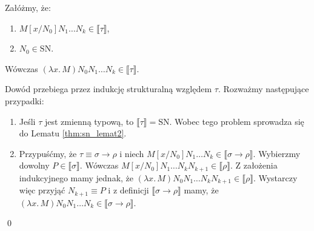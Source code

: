 \begin{lemat}\label{thm:sn_lemat3}
  Załóżmy, że:
  \begin{enumerate}[label=(\alph*)]
    \setlength\itemsep{0em}
    \item  \(M[x/N_0]N_1\dots N_k\in \llbracket \tau \rrbracket\),\label{def:l3_a}
    \item  \(N_0\in \mathrm{SN}\).\label{def:l3_b}
  \end{enumerate}
  Wówczas \((\lambda x.\,M)N_0 N_1 \dots N_k \in \llbracket \tau \rrbracket \).
\end{lemat}
\begin{dowod}
  Dowód przebiega przez indukcję strukturalną względem \(\tau\). Rozważmy następujące przypadki:
  \begin{enumerate}[label=(\alph*)]
    \setlength\itemsep{0em}
    \item Jeśli \(\tau\) jest zmienną typową, to \(\llbracket \tau \rrbracket=\mathrm{SN}\). Wobec tego problem sprowadza się do Lematu \ref{thm:sn_lemat2}.  
    \item Przypuśćmy, że \(\tau\equiv \sigma\to\rho\) i niech \(M[x/N_0]N_1\dots N_k \in \llbracket \sigma\to \rho \rrbracket\). Wybierzmy dowolny \(P\in\llbracket\sigma\rrbracket\). Wówczas \(M[x/N_0] N_1 \dots N_k N_{k+1}\in\llbracket \rho\rrbracket\). Z założenia indukcyjnego mamy jednak, że 
      \(
        (\lambda x.\,M)N_0 N_1\dots N_k N_{k+1}\in\llbracket \rho \rrbracket.
      \)
      Wystarczy więc przyjąć \(N_{k+1}\equiv P\) i z definicji \(\llbracket \sigma \to \rho \rrbracket\) mamy, że \((\lambda x.\,M)N_0 N_1 \dots N_k \in \llbracket \sigma \to \rho \rrbracket\).
  \end{enumerate}
  \qed
\end{dowod}

